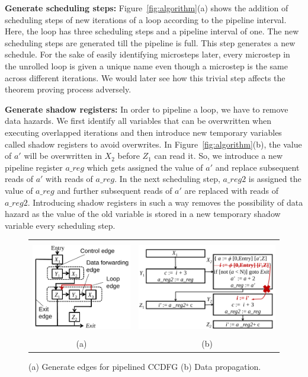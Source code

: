 {\bf Generate scheduling steps:} Figure~\ref{fig:algorithm}(a) shows the addition of scheduling steps of new iterations of a loop according to the pipeline interval. Here, the loop has three scheduling steps and a pipeline interval of one. The new scheduling steps are generated till the pipeline is full. This step generates a new schedule.
For the sake of easily identifying microsteps later, every microstep in the unrolled loop is given a unique name even though
a microstep is the same across different iterations. We would later see how
this trivial step affects the theorem proving process adversely.

{\bf Generate shadow registers:} In order to pipeline a loop, we have to remove data hazards. We first identify all variables that can be overwritten when executing overlapped iterations and then introduce new temporary variables called shadow registers to avoid overwrites. In Figure~\ref{fig:algorithm}(b), the value of $a'$ will be overwritten in $X_2$ before $Z_1$ can read it. So, we introduce a new pipeline register $a\_reg$ which gets assigned the value of $a'$ and replace subsequent reads of $a'$ with reads of $a\_reg$. In the next scheduling step, $a\_reg2$ is assigned the value of $a\_reg$ and further subsequent reads of $a'$ are replaced with reads of $a\_reg2$. Introducing shadow registers in such a way removes the possibility of data hazard as the value of the old variable is stored in a new temporary shadow variable every scheduling step.

\begin{figure}[t!]
\begin{center}
\begin{tabular}{cc}
\includegraphics[height=1.6in]{fig-proposal/generate-edges}
& %
\includegraphics[height=1.6in]{fig-proposal/data-forwarding}
\\
(a) & (b)
\end{tabular}
\end{center}
\caption{(a) Generate edges for pipelined CCDFG (b) Data propagation.}
\label{fig:algorithm-2}
\end{figure}


